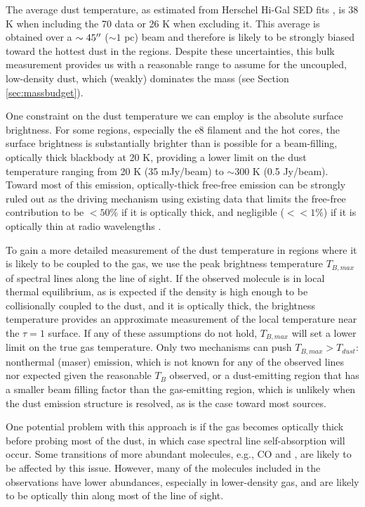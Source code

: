 \documentclass{emulateapj}
\begin{document}
The average dust temperature, as estimated from Herschel Hi-Gal SED fits
\citep{Molinari2016a,Wang2015a}, is 38 K when including the 70 \um data or 26 K
when excluding it.  This average is obtained over a $\sim45\mbox{$^{\prime\prime}$}$ ($\sim 1$
pc) beam and therefore is likely to be strongly biased toward the hottest dust
in the \hii regions.  Despite these
uncertainties, this bulk measurement provides us with a reasonable range to
assume for the uncoupled, low-density dust, which (weakly) dominates the mass
(see Section \ref{sec:massbudget}).

One constraint on the dust temperature we can employ is the absolute surface
brightness.  For some regions, especially the e8 filament and the hot cores,
the surface brightness is substantially
brighter than is possible for a beam-filling, optically thick blackbody at 20
K, providing a lower limit on the dust temperature ranging from 20 K (35
mJy/beam) to $\sim300$ K (0.5 Jy/beam).  Toward most of this emission, optically-thick
free-free emission can be strongly ruled out as the driving mechanism using
existing data that limits the free-free contribution to be $<50\%$ if it is
optically thick, and negligible ($<<1\%$) if it is optically thin at radio wavelengths
\citep{Ginsburg2016b, Goddi2016a}.

To gain a more detailed measurement of the dust temperature in regions where it
is likely to be coupled to the gas, we use the peak brightness temperature
$T_{B,max}$ of spectral lines along the line of sight.  If the observed
molecule is in local thermal equilibrium, as is expected if the density is high
enough to be collisionally coupled to the dust, and it is optically thick, the
brightness temperature provides an approximate measurement of the local
temperature near the $\tau=1$ surface.  If any of these assumptions do not
hold, $T_{B,max}$ will set a lower limit on the true gas temperature.  Only 
two mechanisms can push $T_{B,max} > T_{dust}$: nonthermal (maser) emission, which
is not known for any of the observed lines nor expected given the reasonable
$T_B$ observed, or a dust-emitting region that has a smaller beam filling
factor than the gas-emitting region, which is unlikely when the dust emission
structure is resolved, as is the case toward most sources.

One potential problem with this approach is if the gas becomes optically thick
before probing most of the dust, in which case spectral line self-absorption
will occur.  Some transitions of more abundant molecules, e.g., CO and
\formaldehyde, are likely to be affected by this issue.  However, many of the
molecules included in the observations have lower abundances, especially in lower-density
gas, and are likely to be optically thin along most of the line of sight.
\end{document}
